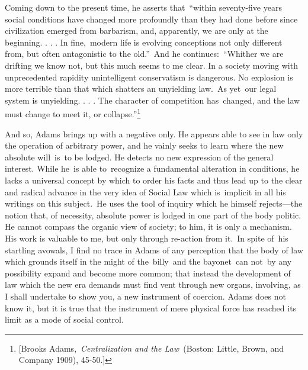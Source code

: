 \documentclass[twoside,symmetric,nobib,justified]{tufte-book}
\begin{document}
\noindent Coming down to the present time, he asserts that~``within seventy-five
years social conditions have changed more profoundly than they had done
before since civilization emerged from barbarism, and, apparently, we
are only at the beginning. . . . In fine,~modern life is evolving
conceptions not only different from, but often antagonistic to the
old.''~And he continues:~``Whither we are drifting we know not, but this
much seems to me clear. In a society moving with unprecedented rapidity
unintelligent conservatism is dangerous. No explosion is more terrible
than that which shatters an unyielding law.~As yet~our legal system is
unyielding. . . . The character of competition has~changed, and the law
must change to meet it, or collapse.''\footnote{{[}Brooks
  Adams,~\emph{Centralization and the Law~}(Boston: Little, Brown, and
  Company 1909), 45-50.{]}}~

And so, Adams brings up with a negative only. He appears able to see in
law only the operation of arbitrary power, and he vainly seeks to learn
where the new absolute will~is~to be lodged. He detects no new
expression of the general interest. While he~is able to~recognize a
fundamental alteration in conditions, he lacks a universal concept by
which to order his facts and thus lead up to the clear and radical
advance in the very idea of Social Law which is~implicit in all his
writings on this subject.~He uses the tool of inquiry which he himself
rejects---the notion that, of necessity, absolute power is lodged in one
part of the body politic. He cannot compass the organic view of society;
to him, it is only a mechanism. His work is valuable to me, but only
through re-action from it.~In spite of~his startling avowals, I find no
trace in Adams of any perception that the body of law which grounds
itself in the might of the~billy~and the bayonet~can not~by any
possibility expand and become more common; that instead the development
of law which the new era demands must find vent through new organs,
involving, as I shall undertake to show you, a new instrument of
coercion. Adams does not know it, but it is true that the instrument of
mere physical force has reached its limit as a mode of social control.~
\end{document}
